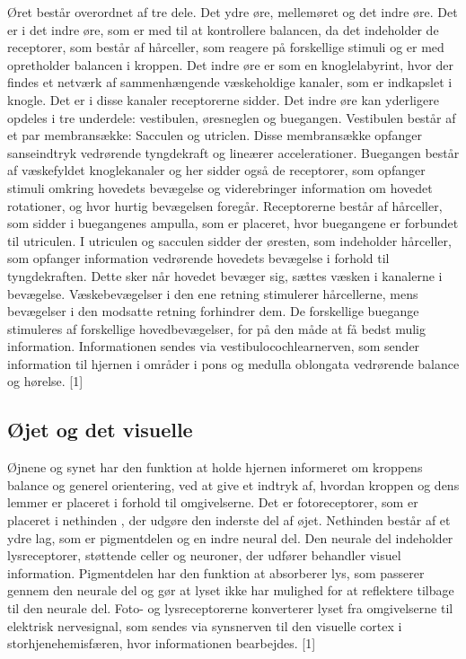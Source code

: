 Øret består overordnet af tre dele. Det ydre øre, mellemøret og det indre øre. Det er i det indre øre, som er med til at kontrollere balancen, da det indeholder de receptorer, som består af hårceller, som reagere på forskellige stimuli og er med opretholder balancen i kroppen. Det indre øre er som en knoglelabyrint, hvor der findes et netværk af sammenhængende væskeholdige kanaler, som er indkapslet i knogle. Det er i disse kanaler receptorerne sidder. Det indre øre kan yderligere opdeles i tre underdele: vestibulen, øresneglen og buegangen. Vestibulen består af et par membransække: Sacculen og utriclen. Disse membransække opfanger sanseindtryk vedrørende tyngdekraft og lineærer accelerationer.  Buegangen består af væskefyldet knoglekanaler og her sidder også de receptorer, som opfanger stimuli omkring hovedets bevægelse og viderebringer information om hovedet rotationer, og hvor hurtig bevægelsen foregår. Receptorerne består af hårceller, som sidder i buegangenes ampulla, som er placeret, hvor buegangene er forbundet til utriculen. I utriculen og sacculen sidder der øresten, som indeholder hårceller, som opfanger information vedrørende hovedets bevægelse i forhold til tyngdekraften. Dette sker når hovedet bevæger sig, sættes væsken i kanalerne i bevægelse. Væskebevægelser i den ene retning stimulerer hårcellerne, mens bevægelser i den modsatte retning forhindrer dem. De forskellige buegange stimuleres af forskellige hovedbevægelser, for på den måde at få bedst mulig information. Informationen sendes via vestibulocochlearnerven, som sender information til hjernen i områder i pons og medulla oblongata vedrørende balance og hørelse. [1]    


\subsection{Øjet og det visuelle}
Øjnene og synet har den funktion at holde hjernen informeret om kroppens balance og generel orientering, ved at give et indtryk af, hvordan kroppen og dens lemmer er placeret i forhold til omgivelserne. Det er fotoreceptorer, som er placeret i nethinden , der udgøre den inderste del af øjet. Nethinden består af et ydre lag, som er pigmentdelen og en indre neural del. Den neurale del indeholder lysreceptorer, støttende celler og neuroner, der udfører behandler visuel information. Pigmentdelen har den funktion at absorberer lys, som passerer gennem den neurale del og gør at lyset ikke har mulighed for at reflektere tilbage til den neurale del. Foto- og lysreceptorerne konverterer lyset fra omgivelserne til elektrisk nervesignal, som sendes via synsnerven til den visuelle cortex i storhjenehemisfæren, hvor informationen bearbejdes. [1]  

